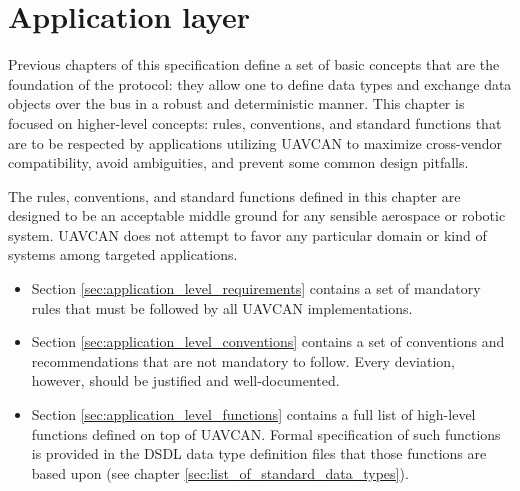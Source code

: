 \chapter{Application layer}\label{sec:application_layer}

Previous chapters of this specification define a set of basic concepts that are the foundation of the protocol:
they allow one to define data types and exchange data objects over the bus in a robust and deterministic manner.
This chapter is focused on higher-level concepts: rules, conventions, and standard functions that are to be
respected by applications utilizing UAVCAN to maximize cross-vendor compatibility, avoid ambiguities, and
prevent some common design pitfalls.

The rules, conventions, and standard functions defined in this chapter are designed to be an acceptable middle
ground for any sensible aerospace or robotic system.
UAVCAN does not attempt to favor any particular domain or kind of systems among targeted applications.

\begin{itemize}
    \item Section \ref{sec:application_level_requirements} contains a set of mandatory rules that must be
    followed by all UAVCAN implementations.

    \item Section \ref{sec:application_level_conventions} contains a set of conventions and recommendations that
    are not mandatory to follow. Every deviation, however, should be justified and well-documented.

    \item Section \ref{sec:application_level_functions} contains a full list of high-level functions defined on
    top of UAVCAN. Formal specification of such functions is provided in the DSDL data type definition files that
    those functions are based upon (see chapter \ref{sec:list_of_standard_data_types}).
\end{itemize}

\clearpage
\clearpage
\clearpage
